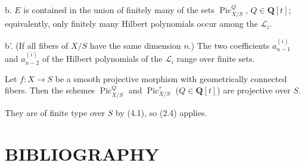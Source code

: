 \noindent b. $E$ is contained in the union of finitely many of the sets
$\operatorname{Pic}_{X/S}^Q$, $Q\in\mathbf Q[t]$; equivalently, only finitely
many Hilbert polynomials occur among the $\mathcal L_i$.

\noindent b'. (If all fibers of $X/S$ have the same dimension $n$.) The two
coefficients $a_{n-1}^{(i)}$ and $a_{n-2}^{(i)}$ of the Hilbert polynomials of
the $\mathcal L_i$ range over finite sets.


 Let $f:X\longrightarrow S$ be a smooth projective
morphism with geometrically connected fibers. Then the schemes
$\operatorname{Pic}_{X/S}^Q$ and $\operatorname{Pic}_{X/S}^\tau$
($Q\in\mathbf Q[t]$) are projective over $S$.

They are of finite type over $S$ by (4.1), so (2.4) applies.

\section*{BIBLIOGRAPHY}

